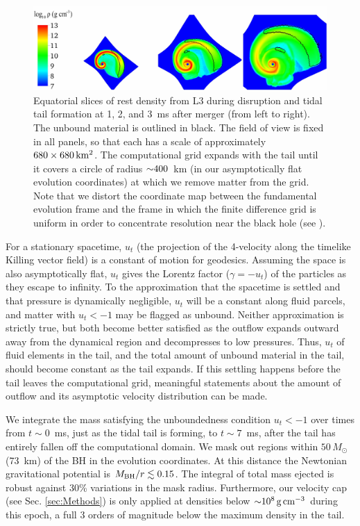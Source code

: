 \begin{figure} \centering
\includegraphics[width=18cm]{Figures/rho_unbound_1ms_2ms_3ms}
\caption[Time sequence of dynamical ejecta]{
Equatorial slices of rest density from L3
during disruption and tidal tail formation at 1, 2, and 3~ms after merger
(from left to right).
The unbound material is outlined in black. The field of
view is fixed in all panels, so that each
has a scale of approximately $680\times680\rm\,km^2$.
The computational grid expands with the tail until it covers a circle of
radius $\mathord{\sim}400$~km (in our asymptotically flat evolution coordinates)
at which we remove matter from the grid. Note that we distort the
coordinate map between the fundamental evolution frame and the
frame in which the finite difference grid is uniform
in order to concentrate resolution near the black hole (see \citealt{duez2009-3d_eos_advection}).
}
\label{fig:disruptionsnapshots}
\end{figure}

For a stationary spacetime, $u_t$ (the projection of the 4-velocity along
the timelike Killing vector field) is a constant of motion for geodesics. 
Assuming the space is also asymptotically flat, $u_t$ gives the Lorentz
factor ($\gamma=-u_t$) of the particles as they escape to infinity.  To the
approximation that the spacetime is settled and that pressure is dynamically
negligible, $u_t$ will be a constant along fluid parcels, and matter with
$u_t<-1$ may be flagged as unbound. Neither approximation is strictly true,
but both become better satisfied as the outflow expands outward away from
the dynamical region and decompresses to low pressures.  Thus, $u_t$ of
fluid elements in the tail, and the total amount of unbound material in
the tail, should become constant as the tail expands.  If this settling
happens before the tail leaves the computational grid, meaningful statements
about the amount of outflow and its asymptotic velocity distribution can
be made.

We integrate the mass satisfying the unboundedness
condition $u_t<-1$ over times from $t \sim 0$~ms, just as
the tidal tail is forming, to $t \sim 7$~ms, after the tail has entirely fallen off
the computational domain. We mask out regions within
$50\,M_{\odot}$ (73~km) of the BH in the evolution coordinates.
At this distance the Newtonian gravitational
potential is $M_{\rm BH}/r \lesssim 0.15$.
The integral of total mass ejected is robust against
30\% variations in the mask radius.
Furthermore, our velocity cap (see Sec. \ref{sec:Methods}) is only applied
at densities below $\mathord{\sim} 10^{8}\rm\,g\,cm^{-3}$ during this epoch, a full 3
orders of magnitude below the maximum density in the tail.

